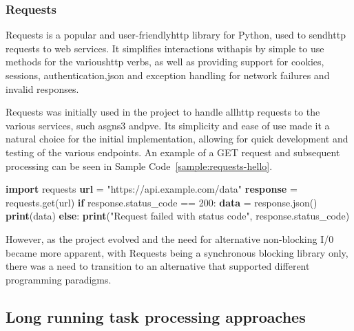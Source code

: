     \subsubsection{Requests}
      Requests\cite{requests2025} is a popular and user-friendly\ac{http} library for Python, used to send\ac{http} 
      requests to web services. It simplifies interactions with\ac{api}s by simple to use methods for the various\ac{http} verbs, 
      as well as providing support for cookies, sessions, authentication,\ac{json} and exception handling for network failures and 
      invalid responses.

      Requests was initially used in the project to handle all\ac{http} requests to the various services, such as\ac{gns3} and\ac{pve}. 
      Its simplicity and ease of use made it a natural choice for the initial implementation, allowing for quick development and testing 
      of the various endpoints. An example of a GET request and subsequent processing can be seen in Sample Code~\ref{sample:requests-hello}.

      \begin{algorithm}
        \caption{Making a Synchronous HTTP Request Using Requests}\label{requests-basic}
        \begin{algorithmic}[1]
          \State \textbf{import} requests
          \State
          \State \textbf{url} = "https://api.example.com/data"
          \State \textbf{response} = requests.get(url)
          \State
          \State \textbf{if} response.status\_code == 200:
          \State \hspace{1em} \textbf{data} = response.json()
          \State \hspace{1em} \textbf{print}(data)
          \State \textbf{else}:
          \State \hspace{1em} \textbf{print}("Request failed with status code", response.status\_code)
        \end{algorithmic}
        \label{sample:requests-hello}
      \end{algorithm}

      However, as the project evolved and the need for alternative non-blocking I/0 became more apparent, with Requests being a 
      synchronous blocking library only, there was a need to transition to an alternative that supported different programming paradigms.


  \subsection{Long running task processing approaches}

